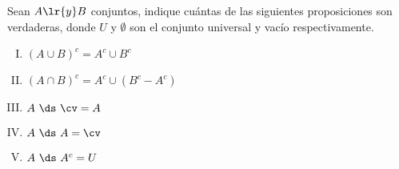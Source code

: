 \noindent
Sean $ A \lr{ y }  B $ conjuntos, indique cuántas de las siguientes proposiciones son verdaderas, donde $U$ y $\emptyset$  son el conjunto universal y vacío respectivamente.
\begin{enumerate}[I.]
	\item $ (A\cup B)^c = A^c\cup B^c  $
	\item $ (A\cap B)^c=A^c\cup(B^c-A^c) $
	\item $ A\ \ds\ \cv=A $
	\item $ A\ \ds\ A=\cv $
	\item $ A\ \ds\ A^c=U $
\end{enumerate}
